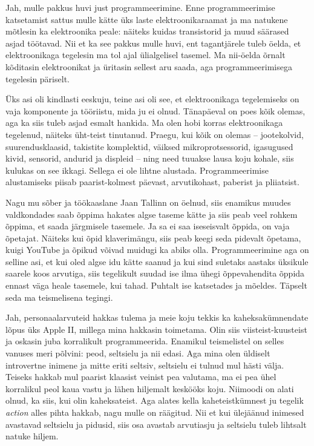 
Jah, mulle pakkus huvi just programmeerimine. Enne programmeerimise katsetamist 
sattus mulle kätte üks laste 
elektroonikaraamat ja ma natukene mõtlesin ka
elektroonika peale: näiteks kuidas transistorid ja muud säärased asjad 
töötavad. 
Nii et ka see pakkus mulle huvi, ent tagantjärele tuleb öelda, et 
elektroonikaga tegelesin ma tol ajal ülialgelisel tasemel. Ma 
nii-öelda õrnalt kõditasin elektroonikat ja 
üritasin sellest aru saada, aga programmeerimisega tegelesin  
päriselt.


Üks asi oli kindlasti eeskuju, teine asi oli see, et 
elektroonikaga tegelemiseks on vaja komponente ja 
tööriistu, mida ju ei olnud. Tänapäeval on poes kõik 
olemas, aga ka siis tuleb asjad esmalt hankida. Ma olen hobi korras 
elektroonikaga tegelenud, näiteks üht-teist
tinutanud. Praegu, kui kõik on olemas – jootekolvid, suurendusklaasid, 
takistite 
komplektid, väiksed mikroprotsessorid, igasugused kivid, sensorid, andurid 
ja displeid – ning need tuuakse lausa koju kohale, siis kulukas on see ikkagi. 
Sellega ei ole lihtne alustada. Programmeerimise alustamiseks piisab 
paarist-kolmest päevast, arvutikohast, paberist ja pliiatsist.

Nagu mu sõber ja töökaaslane Jaan Tallinn on  
öelnud, siis enamikus muudes  
valdkondades saab õppima hakates 
algse taseme kätte ja siis peab veel rohkem õppima, et saada järgmisele 
tasemele. Ja sa ei saa iseseisvalt õppida,  
on vaja õpetajat. Näiteks kui õpid klaverimängu, siis peab keegi seda pidevalt 
õpetama, kuigi YouTube ja
õpikud võivad muidugi ka abiks olla. 
Programmeerimine aga on selline asi, et kui oled algse idu
kätte saanud ja kui sind suletaks aastaks üksikule saarele koos arvutiga, siis 
tegelikult suudad ise ilma ühegi õppevahendita õppida 
ennast väga heale tasemele, kui tahad. Puhtalt ise katsetades ja mõeldes. 
Täpselt seda ma teismelisena tegingi.


Jah, personaalarvuteid hakkas tulema ja meie koju tekkis ka kaheksakümnendate 
lõpus üks Apple 
II, millega mina hakkasin toimetama. Olin siis 
viisteist-kuusteist ja oskasin 
juba korralikult programmeerida. Enamikul teismelistel on selles vanuses meri 
põlvini: peod, seltsielu ja nii edasi. Aga mina 
olen üldiselt introvertne inimene ja mitte eriti seltsiv, seltsielu ei tulnud 
mul hästi välja. Teiseks hakkab mul 
paarist klaasist veinist pea valutama, ma ei pea 
ühel korralikul peol kaua vastu ja lähen hiljemalt 
keskööks koju. Niimoodi on alati olnud, ka siis, kui olin 
kaheksateist. Aga alates kella kaheteistkümnest ju tegelik 
\emph{action} alles pihta hakkab, nagu mulle on räägitud. Nii et kui ülejäänud 
inimesed avastavad seltsielu 
ja pidusid, siis osa avastab arvutiasju ja 
seltsielu tuleb lihtsalt natuke hiljem.

